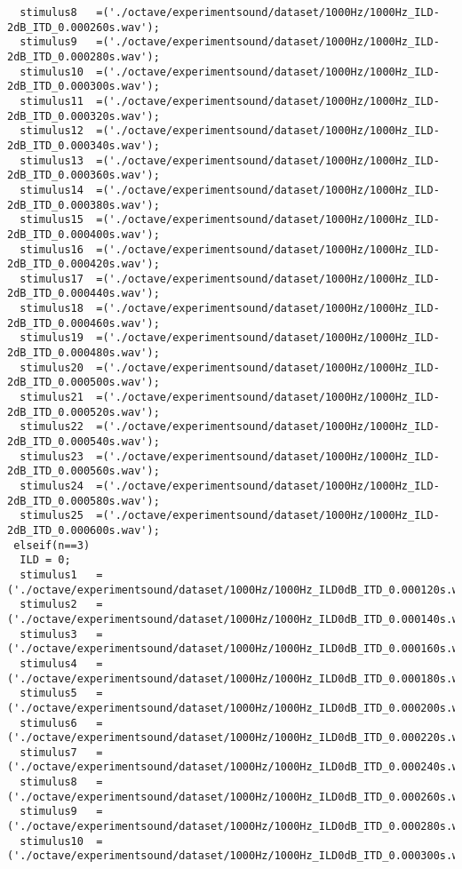 {\begin{verbatim}
  stimulus8   =('./octave/experimentsound/dataset/1000Hz/1000Hz_ILD-2dB_ITD_0.000260s.wav');
  stimulus9   =('./octave/experimentsound/dataset/1000Hz/1000Hz_ILD-2dB_ITD_0.000280s.wav');
  stimulus10  =('./octave/experimentsound/dataset/1000Hz/1000Hz_ILD-2dB_ITD_0.000300s.wav');
  stimulus11  =('./octave/experimentsound/dataset/1000Hz/1000Hz_ILD-2dB_ITD_0.000320s.wav');
  stimulus12  =('./octave/experimentsound/dataset/1000Hz/1000Hz_ILD-2dB_ITD_0.000340s.wav');
  stimulus13  =('./octave/experimentsound/dataset/1000Hz/1000Hz_ILD-2dB_ITD_0.000360s.wav');
  stimulus14  =('./octave/experimentsound/dataset/1000Hz/1000Hz_ILD-2dB_ITD_0.000380s.wav');
  stimulus15  =('./octave/experimentsound/dataset/1000Hz/1000Hz_ILD-2dB_ITD_0.000400s.wav');
  stimulus16  =('./octave/experimentsound/dataset/1000Hz/1000Hz_ILD-2dB_ITD_0.000420s.wav');
  stimulus17  =('./octave/experimentsound/dataset/1000Hz/1000Hz_ILD-2dB_ITD_0.000440s.wav');
  stimulus18  =('./octave/experimentsound/dataset/1000Hz/1000Hz_ILD-2dB_ITD_0.000460s.wav');
  stimulus19  =('./octave/experimentsound/dataset/1000Hz/1000Hz_ILD-2dB_ITD_0.000480s.wav');
  stimulus20  =('./octave/experimentsound/dataset/1000Hz/1000Hz_ILD-2dB_ITD_0.000500s.wav');
  stimulus21  =('./octave/experimentsound/dataset/1000Hz/1000Hz_ILD-2dB_ITD_0.000520s.wav');
  stimulus22  =('./octave/experimentsound/dataset/1000Hz/1000Hz_ILD-2dB_ITD_0.000540s.wav');
  stimulus23  =('./octave/experimentsound/dataset/1000Hz/1000Hz_ILD-2dB_ITD_0.000560s.wav');
  stimulus24  =('./octave/experimentsound/dataset/1000Hz/1000Hz_ILD-2dB_ITD_0.000580s.wav');
  stimulus25  =('./octave/experimentsound/dataset/1000Hz/1000Hz_ILD-2dB_ITD_0.000600s.wav');
 elseif(n==3)
  ILD = 0;
  stimulus1   =('./octave/experimentsound/dataset/1000Hz/1000Hz_ILD0dB_ITD_0.000120s.wav');
  stimulus2   =('./octave/experimentsound/dataset/1000Hz/1000Hz_ILD0dB_ITD_0.000140s.wav');
  stimulus3   =('./octave/experimentsound/dataset/1000Hz/1000Hz_ILD0dB_ITD_0.000160s.wav');
  stimulus4   =('./octave/experimentsound/dataset/1000Hz/1000Hz_ILD0dB_ITD_0.000180s.wav');
  stimulus5   =('./octave/experimentsound/dataset/1000Hz/1000Hz_ILD0dB_ITD_0.000200s.wav');
  stimulus6   =('./octave/experimentsound/dataset/1000Hz/1000Hz_ILD0dB_ITD_0.000220s.wav');
  stimulus7   =('./octave/experimentsound/dataset/1000Hz/1000Hz_ILD0dB_ITD_0.000240s.wav');
  stimulus8   =('./octave/experimentsound/dataset/1000Hz/1000Hz_ILD0dB_ITD_0.000260s.wav');
  stimulus9   =('./octave/experimentsound/dataset/1000Hz/1000Hz_ILD0dB_ITD_0.000280s.wav');
  stimulus10  =('./octave/experimentsound/dataset/1000Hz/1000Hz_ILD0dB_ITD_0.000300s.wav');

\end{verbatim}}
